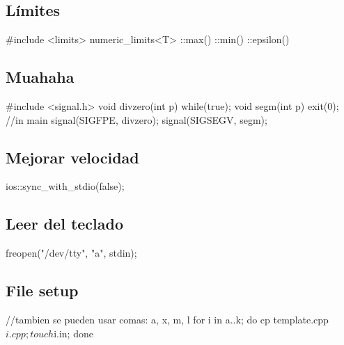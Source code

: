 \subsection*{Límites}
\begin{code}
#include <limits>
numeric_limits<T>
	::max()
	::min()
	::epsilon()
\end{code}
\subsection*{Muahaha}
\begin{code}
#include <signal.h>
void divzero(int p){
	while(true);}
void segm(int p){
	exit(0);}
//in main
signal(SIGFPE, divzero);
signal(SIGSEGV, segm);
\end{code}
\subsection*{Mejorar velocidad}
\begin{code}
ios::sync_with_stdio(false);
\end{code}
\subsection*{Leer del teclado}
\begin{code}
freopen("/dev/tty", "a", stdin);
\end{code}
\subsection*{File setup}
\begin{code}
//tambien se pueden usar comas: {a, x, m, l}
for i in {a..k}; do cp template.cpp $i.cpp; touch $i.in; done
\end{code}

